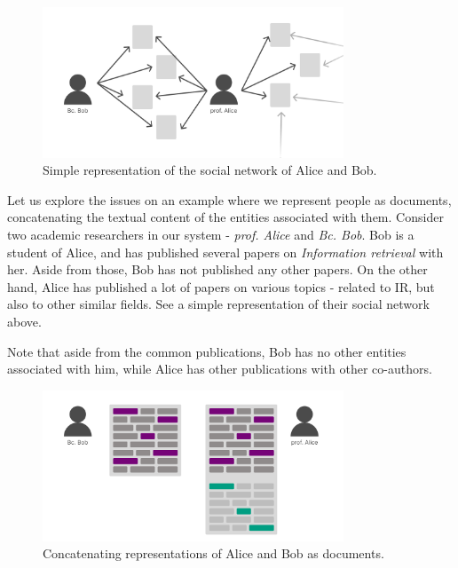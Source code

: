 \begin{figure}[ht!]
    \captionsetup{width=.9\linewidth}
    \includegraphics[width=0.8\textwidth]{../img/bob-alice-soc-netw.png}
    \centering
    \caption{Simple representation of the social network of Alice and Bob.}
\end{figure}

Let us explore the issues on an example where we represent people as documents, concatenating the textual content of the entities associated with them.
Consider two academic researchers in our system - \textit{prof. Alice} and \textit{Bc. Bob}. 
Bob is a student of Alice, and has published several papers on \textit{Information retrieval} with her. Aside from those, Bob has not published any other papers.
On the other hand, Alice has published a lot of papers on various topics - related to IR, but also to other similar fields. 
See a simple representation of their social network above.

Note that aside from the common publications, Bob has no other entities associated with him, while Alice has other publications with other co-authors.

\begin{figure}[ht!]
    \captionsetup{width=.9\linewidth}
    \includegraphics[width=0.8\textwidth]{../img/bob-alice-representations.png}
    \centering
    \caption{Concatenating representations of Alice and Bob as documents.}
\end{figure}

